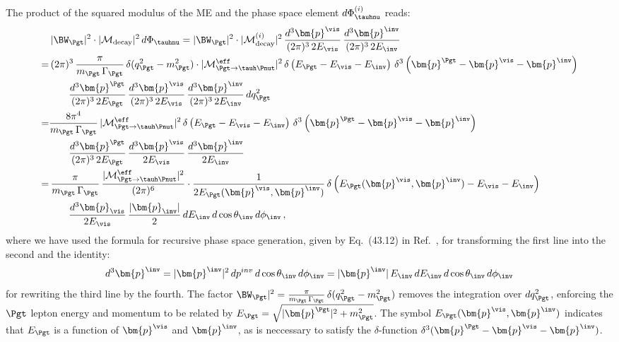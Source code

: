 The product of the squared modulus of the ME and the phase space
element $d\Phi^{(i)}_{\tauhnu}$ reads:
\begin{align}
 & \, \vert \BW_{\Pgt} \vert^{2} \cdot \vert\mathcal{M}_{\textrm{decay}}\vert^{2} \,
 d\Phi_{\tauhnu} = \vert \BW_{\Pgt} \vert^{2} \cdot \vert \mathcal{M}^{(i)}_{\textrm{decay}}
\vert^{2} \, \frac{d^{3}\bm{p}^{\vis}}{(2\pi)^{3} \, 2
   E_{\vis}} \, \frac{d^{3}\bm{p}^{\inv}}{(2\pi)^{3} \, 2 E_{\inv}} \nonumber \\
= & \, (2\pi)^{3} \, \frac{\pi}{m_{\Pgt} \, \Gamma_{\Pgt}} \,
\delta ( q_{\Pgt}^{2} - m_{\Pgt}^{2} ) \cdot \vert\mathcal{M}^{\eff}_{\Pgt \to
  \tauh\Pnut}\vert^{2} \, \delta \left( E_{\Pgt} - E_{\vis} -
  E_{\inv} \right) \, \delta^{3} \left( \bm{p}^{\Pgt} - \bm{p}^{\vis}
  - \bm{p}^{\inv} \right) \nonumber \\
& \qquad \frac{d^{3}\bm{p}^{\Pgt}}{(2\pi)^{3} \, 2 E_{\Pgt}} \, 
  \frac{d^{3}\bm{p}^{\vis}}{(2\pi)^{3} \, 2E_{\vis}} \, \frac{d^{3}\bm{p}^{\inv}}{(2\pi)^{3} \, 2 E_{\inv}} \, dq^{2}_{\Pgt} \nonumber \\
= & \frac{8\pi^{4}}{m_{\Pgt} \, \Gamma_{\Pgt}} \, \vert\mathcal{M}^{\eff}_{\Pgt \to
  \tauh\Pnut}\vert^{2} \, \delta \left( E_{\Pgt} - E_{\vis} -
  E_{\inv} \right) \, \delta^{3} \left( \bm{p}^{\Pgt} - \bm{p}^{\vis}
  - \bm{p}^{\inv} \right) \nonumber \\
& \qquad \frac{d^{3}\bm{p}^{\Pgt}}{(2\pi)^{3} \, 2 E_{\Pgt}} \, 
  \frac{d^{3}\bm{p}^{\vis}}{2 E_{\vis}} \, \frac{d^{3}\bm{p}^{\inv}}{2
    E_{\inv}} \nonumber \\
= & \, \frac{\pi}{m_{\Pgt} \, \Gamma_{\Pgt}} \, \frac{\vert\mathcal{M}^{\eff}_{\Pgt \to
  \tauh\Pnut}\vert^{2}}{(2\pi)^{6}} 
 \cdot \frac{1}{2 E_{\Pgt}(\bm{p}^{\vis}, \bm{p}^{\inv})} \, \delta
 \left( E_{\Pgt}(\bm{p}^{\vis}, \bm{p}^{\inv}) - E_{\vis} - E_{\inv}
 \right) \nonumber \\
& \qquad
  \frac{d^{3}\bm{p}_{\vis}}{2 E_{\vis}} \, \frac{\vert\bm{p}_{\inv}\vert}{2} \, dE_{\inv} \, d\cos\theta_{\inv} \, d\phi_{\inv} \, ,
\label{eq:hadTauDecaysPSint}
\end{align}
where we have used the formula for recursive phase space generation,
given by Eq.~(43.12) in Ref.~\cite{PDG}, for transforming the first line into the second
and the identity:
\begin{equation} 
d^{3}\bm{p}^{\inv} = \vert\bm{p}^{\inv}\vert^{2} \,
dp^{inv} \, d\cos\theta_{\inv} \, d\phi_{\inv} =
\vert\bm{p}^{\inv}\vert \, E_{\inv} \, dE_{\inv} \, d\cos\theta_{\inv}
\, d\phi_{\inv}
\end{equation} 
for rewriting the third line by the fourth.
The factor $\BW_{\Pgt} \vert^{2} = \frac{\pi}{m_{\Pgt} \,
  \Gamma_{\Pgt}} \, \delta ( q^{2}_{\Pgt} - m^{2}_{\Pgt} )$ removes
the integration over $dq^{2}_{\Pgt}$, enforcing the $\Pgt$ lepton
energy and momentum to be related by $E_{\Pgt} =
\sqrt{\vert\bm{p}^{\Pgt}\vert^{2} + m_{\Pgt}^{2}}$.
The symbol $E_{\Pgt}(\bm{p}^{\vis}, \bm{p}^{\inv})$
indicates that $E_{\Pgt}$ is a function of $\bm{p}^{\vis}$
and $\bm{p}^{\inv}$, as is neccessary to satisfy the $
\delta$-function $\delta^{3} ( \bm{p}^{\Pgt} - \bm{p}^{\vis} - \bm{p}^{\inv} )$.

